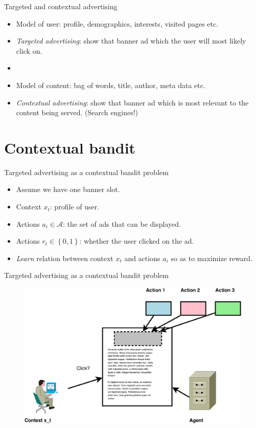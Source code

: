 \documentclass{beamer}
\newcommand{\setof}[1]{\ensuremath{\left \{ #1 \right \}}}
\begin{document}
\begin{frame}{Targeted and contextual advertising}
  \begin{itemize}
    \item{Model of user: profile, demographics, interests, visited pages etc.}
    \item{\emph{Targeted advertising}: show that banner ad which the user will
      most likely click on.}
    \item[]{}
    \item{Model of content: bag of words, title, author, meta data etc.}
    \item{\emph{Contextual advertising}: show that banner ad which is most
      relevant to the content being served. (Search engines!)}
  \end{itemize}
\end{frame}

\section{Contextual bandit}
\frame{\sectionpage}

\begin{frame}{Targeted advertising as a contextual bandit problem}
  \begin{itemize}
    \item{Assume we have one banner slot.}
    \item{Context $x_t$: profile of user.}
    \item{Actions $a_i \in \mathcal{A}$: the set of ads that can be displayed.}
    \item{Actions $r_t \in \setof{0,1}$: whether the user clicked on the ad.}
    \item{\emph{Learn} relation between context $x_t$ and actions $a_i$ so as
      to maximize reward.}
  \end{itemize}
\end{frame}

\begin{frame}{Targeted advertising as a contextual bandit problem}
  \begin{figure}
    \includegraphics[width=\linewidth]{ta.eps}
  \end{figure}
\end{frame}
\end{document}
